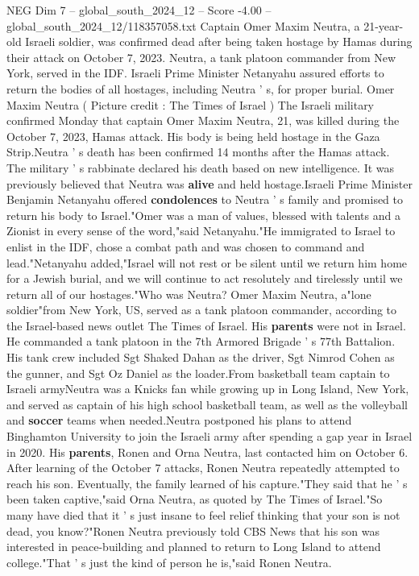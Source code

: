\begin{textsample}{NEG Dim 7 – global\_south\_2024\_12 – Score -4.00 – global\_south\_2024\_12/118357058.txt}  \label{ex:f7_neg_298}
Captain Omer Maxim Neutra, a 21-year-old Israeli soldier, was confirmed dead after being taken hostage by Hamas during their attack on October 7, 2023.
Neutra, a tank platoon commander from New York, served in the IDF.
Israeli Prime Minister Netanyahu assured efforts to return the bodies of all hostages, including Neutra ' s, for proper burial.
Omer Maxim Neutra ( Picture credit : The Times of Israel ) The Israeli military confirmed Monday that captain Omer Maxim Neutra, 21, was killed during the October 7, 2023, Hamas attack.
His body is being held hostage in the Gaza Strip.Neutra ' s death has been confirmed 14 months after the Hamas attack.
The military ' s rabbinate declared his death based on new intelligence.
It was previously believed that Neutra was \textbf{alive} and held hostage.Israeli Prime Minister Benjamin Netanyahu offered \textbf{condolences} to Neutra ' s family and promised to return his body to Israel."Omer was a man of values, blessed with talents and a Zionist in every sense of the word,"said Netanyahu."He immigrated to Israel to enlist in the IDF, chose a combat path and was chosen to command and lead."Netanyahu added,"Israel will not rest or be silent until we return him home for a Jewish burial, and we will continue to act resolutely and tirelessly until we return all of our hostages."Who was Neutra?
Omer Maxim Neutra, a"lone soldier"from New York, US, served as a tank platoon commander, according to the Israel-based news outlet The Times of Israel.
His \textbf{parents} were not in Israel.
He commanded a tank platoon in the 7th Armored Brigade ' s 77th Battalion.
His tank crew included Sgt Shaked Dahan as the driver, Sgt Nimrod Cohen as the gunner, and Sgt Oz Daniel as the loader.From basketball team captain to Israeli armyNeutra was a Knicks fan while growing up in Long Island, New York, and served as captain of his high school basketball team, as well as the volleyball and \textbf{soccer} teams when needed.Neutra postponed his plans to attend Binghamton University to join the Israeli army after spending a gap year in Israel in 2020.
His \textbf{parents}, Ronen and Orna Neutra, last contacted him on October 6.
After learning of the October 7 attacks, Ronen Neutra repeatedly attempted to reach his son.
Eventually, the family learned of his capture."They said that he ' s been taken captive,"said Orna Neutra, as quoted by The Times of Israel."So many have died that it ' s just insane to feel relief thinking that your son is not dead, you know?"Ronen Neutra previously told CBS News that his son was interested in peace-building and planned to return to Long Island to attend college."That ' s just the kind of person he is,"said Ronen Neutra.

\end{textsample}
